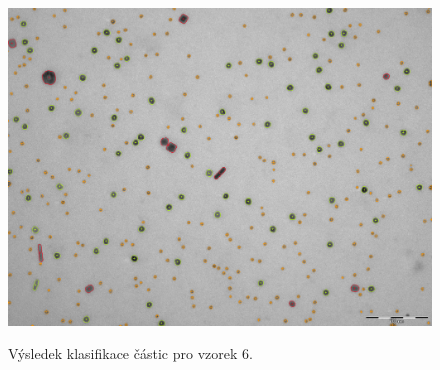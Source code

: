 \documentclass[11pt,twoside,a4paper,table]{book}
\begin{document}
\begin{figure}[h]
\center
\includegraphics[width=\textwidth]{figures/multi8_klasifikace.png}
\label{fig:class6}
\caption{Výsledek klasifikace částic pro vzorek 6.}
\end{figure}
\end{document}
